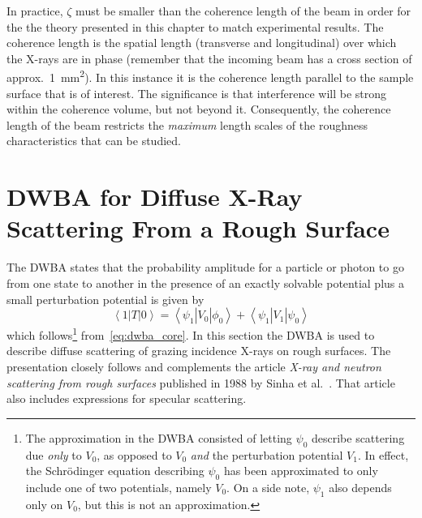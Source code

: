 \documentclass[10pt,twoside, b5paper,pdftex]{report}
\newcommand{\bra}[1]{\ensuremath{\left\langle#1\right|}}
\newcommand{\ket}[1]{\ensuremath{\left|#1\right\rangle}}
\begin{document}
In practice, $\zeta$ must be smaller than the coherence length of the beam in order for the the theory presented in this chapter to match experimental results.  The coherence length is the spatial length (transverse and longitudinal) over which the X-rays are in phase (remember that the incoming beam has a cross section of approx.~\SI{1}{\milli\meter^2}). In this instance it is the coherence length parallel to the sample surface that is of interest.  The significance is that interference will be strong within the coherence volume, but not beyond it. Consequently, the coherence length of the beam restricts the {\it maximum} length scales of the roughness characteristics that can be studied.

\newpage

\section{DWBA for Diffuse X-Ray Scattering From a Rough Surface} \label{sec:dwba_xray}
The DWBA states that the probability amplitude for a particle or photon to go from one state to another in the presence of an exactly solvable potential plus a small perturbation potential is given by
\begin{equation}\label{eq:dwba}
  \boxed{\bra{1}T\ket{0} = \bra{\psi_{1}}V_{0}\ket{\phi_{0}} + \bra{\psi_{1}}V_{1}\ket{\psi_{0}}}
\end{equation}
 which follows\footnote{The approximation in the DWBA consisted of letting $\psi_{0}$ describe scattering due {\it only} to $V_{0}$, as opposed to $V_{0}$ {\it and} the perturbation potential $V_{1}$. In effect, the Schrödinger equation describing $\psi_{0}$ has been approximated to only include one of two potentials, namely $V_{0}$. On a side note, $\psi_{1}$ also depends only on $V_0$, but this is not an approximation.} from~\cref{eq:dwba_core}.  In this section the DWBA is used to describe diffuse scattering of grazing incidence X-rays on rough surfaces. 
The presentation closely follows and complements the article {\it X-ray and neutron scattering from rough surfaces} published in 1988 by Sinha et al.~\cite{SINHA}. That article also includes expressions for specular scattering.
\end{document}
